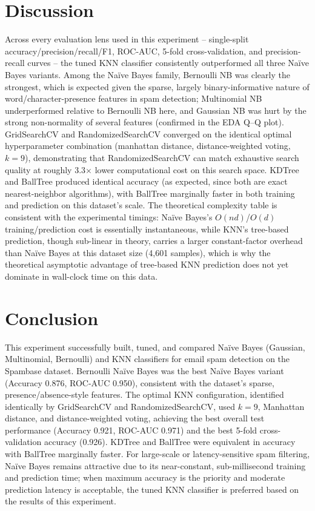 \documentclass[12pt,a4paper]{article}
\DeclareRobustCommand{\_}{\textunderscore\allowbreak}
\begin{document}
\section{Discussion}
Across every evaluation lens used in this experiment -- single-split
accuracy/\allowbreak precision/\allowbreak recall/\allowbreak F1, ROC-AUC, 5-fold cross-validation, and
precision-recall curves -- the tuned KNN classifier consistently
outperformed all three Na\"ive Bayes variants. Among the Na\"ive Bayes
family, Bernoulli NB was clearly the strongest, which is expected given the
sparse, largely binary-informative nature of word/character-presence
features in spam detection; Multinomial NB underperformed relative to
Bernoulli NB here, and Gaussian NB was hurt by the strong non-normality of
several features (confirmed in the EDA Q--Q plot). GridSearchCV and
RandomizedSearchCV converged on the identical optimal hyperparameter
combination (manhattan distance, distance-weighted voting, $k=9$),
demonstrating that RandomizedSearchCV can match exhaustive search quality at
roughly 3.3$\times$ lower computational cost on this search space. KDTree
and BallTree produced identical accuracy (as expected, since both are exact
nearest-neighbor algorithms), with BallTree marginally faster in both
training and prediction on this dataset's scale. The theoretical complexity
table is consistent with the experimental timings: Na\"ive Bayes's
$O(nd)$/$O(d)$ training/prediction cost is essentially instantaneous, while
KNN's tree-based prediction, though sub-linear in theory, carries a larger
constant-factor overhead than Na\"ive Bayes at this dataset size (4{,}601
samples), which is why the theoretical asymptotic advantage of tree-based
KNN prediction does not yet dominate in wall-clock time on this data.

\section{Conclusion}
This experiment successfully built, tuned, and compared Na\"ive Bayes
(Gaussian, Multinomial, Bernoulli) and KNN classifiers for email spam
detection on the Spambase dataset. Bernoulli Na\"ive Bayes was the best
Na\"ive Bayes variant (Accuracy 0.876, ROC-AUC 0.950), consistent with the
dataset's sparse, presence/absence-style features. The optimal KNN
configuration, identified identically by GridSearchCV and
RandomizedSearchCV, used $k=9$, Manhattan distance, and distance-weighted
voting, achieving the best overall test performance (Accuracy 0.921, ROC-AUC
0.971) and the best 5-fold cross-validation accuracy (0.926). KDTree and
BallTree were equivalent in accuracy with BallTree marginally faster.
For large-scale or latency-sensitive spam filtering, Na\"ive Bayes remains
attractive due to its near-constant, sub-millisecond training and prediction
time; when maximum accuracy is the priority and moderate prediction latency
is acceptable, the tuned KNN classifier is preferred based on the results of
this experiment.
\end{document}
